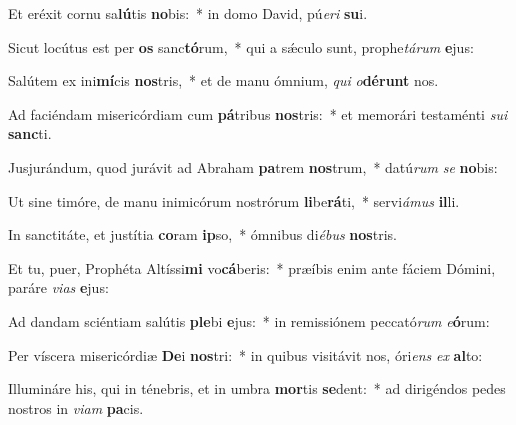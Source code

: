 \item Et eréxit cornu sa\textbf{lú}tis \textbf{no}bis:~* in domo David, pú\textit{e}\textit{ri} \textbf{su}i.
\item Sicut locútus est per \textbf{os} sanc\textbf{tó}rum,~* qui a sǽculo sunt, prophe\textit{tá}\textit{rum} \textbf{e}jus:
\item Salútem ex ini\textbf{mí}cis \textbf{nos}tris,~* et de manu ómnium, \textit{qui} \textit{o}\textbf{dé}\textbf{runt} nos.
\item Ad faciéndam misericórdiam cum \textbf{pá}tribus \textbf{nos}tris:~* et memorári testaménti \textit{su}\textit{i} \textbf{sanc}ti.
\item Jusjurándum, quod jurávit ad Abraham \textbf{pa}trem \textbf{nos}trum,~* datú\textit{rum} \textit{se} \textbf{no}bis:
\item Ut sine timóre, de manu inimicórum nostrórum \textbf{li}be\textbf{rá}ti,~* servi\textit{á}\textit{mus} \textbf{il}li.
\item In sanctitáte, et justítia \textbf{co}ram \textbf{ip}so,~* ómnibus di\textit{é}\textit{bus} \textbf{nos}tris.
\item Et tu, puer, Prophéta Altíssi\textbf{mi} vo\textbf{cá}beris:~* præíbis enim ante fáciem Dómini, paráre \textit{vi}\textit{as} \textbf{e}jus:
\item Ad dandam sciéntiam salútis \textbf{ple}bi \textbf{e}jus:~* in remissiónem peccató\textit{rum} \textit{e}\textbf{ó}rum:
\item Per víscera misericórdiæ \textbf{De}i \textbf{nos}tri:~* in quibus visitávit nos, óri\textit{ens} \textit{ex} \textbf{al}to:
\item Illumináre his, qui in ténebris, et in umbra \textbf{mor}tis \textbf{se}dent:~* ad dirigéndos pedes nostros in \textit{vi}\textit{am} \textbf{pa}cis.
